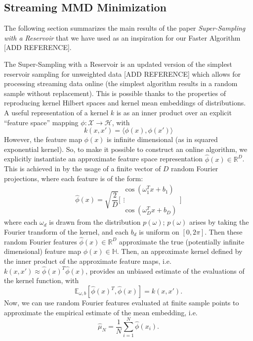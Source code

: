 \documentclass{article}
\begin{document}
	
	\subsection{Streaming MMD Minimization}
	
	The following section summarizes the main results of the paper \textit{Super-Sampling with a Reservoir} \cite{streaming} that we have used as an inspiration for our Faster Algorithm [ADD REFERENCE]. 
	
	The Super-Sampling with a Reservoir is an updated version of the simplest reservoir sampling for unweighted data [ADD REFERENCE] which allows for processing streaming data online (the simplest algorithm results in a random sample without replacement). This is possible thanks to the properties of reproducing kernel Hilbert spaces and kernel mean embeddings of distributions. A useful representation of a kernel $k$ is as an inner product over an explicit ``feature space'' mapping $\phi: \mathcal{X} \rightarrow \mathcal{H}$, with
	\begin{equation*}
	k(x, x') = \langle \phi(x), \phi(x') \rangle
	\end{equation*}
	However, the feature map $\phi(x)$ is infinite dimensional (as in squared exponential kernel). So, to make it possible to construct an online algorithm, we explicitly instantiate an approximate feature space representation $\hat{\phi}(x) \in \mathbb{R}^D$. This is achieved in \cite{streaming} by the usage of a finite vector of $D$ random Fourier projections, where each feature is of the form:
	\begin{equation*}
	\hat{\phi}(x) = \sqrt{\frac{2}{D}} \Bigg[
	\begin{array}{c} \cos (\omega_1^T x + b_1)  \\ \vdots \\ \cos (\omega_D^T x + b_D) \end{array} \Bigg]
	\end{equation*}
	where each $\omega_d$ is drawn from the distribution $p(\omega)$; $p(\omega)$ arises by taking the Fourier transform of the kernel, and each $b_d$ is uniform on $[0, 2\pi]$. Then these random Fourier features $\hat{\phi}(x) \in \mathbb{R}^D$ approximate the true (potentially infinite dimensional) feature map $\phi(x) \in \mathbb{H}$. Then, an approximate kernel defined by the inner product of the approximate feature maps, i.e. $k(x, x') \approx \hat{\phi}(x)^T \hat{\phi}(x)$, provides an unbiased estimate of the evaluations of the kernel function, with
	\begin{equation*}
	\mathbb{E}_{\omega, b}[\hat{\phi}(x)^T, \hat{\phi}(x)] = k(x, x').
	\end{equation*}
	Now, we can use random Fourier features evaluated at finite sample points to approximate the empirical estimate of the mean embedding, i.e.
	\begin{equation}
	\label{eq:muhat}
	\hat{\mu}_N = \frac{1}{N} \sum_{i=1}^{N} \hat{\phi}(x_i).
	\end{equation}
	
\end{document}
